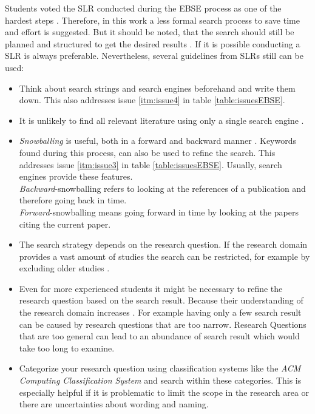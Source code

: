 Students voted the SLR conducted during the EBSE process as one of the hardest steps \cite{keele2007}. Therefore, in this work a less formal search process to save time and effort is suggested. But it should be noted, that the search should still be planned and structured to get the desired results . If it is possible conducting a SLR is always preferable.
\newline
\newline
Nevertheless, several guidelines from SLRs still can be used:
\begin{itemize}
\item Think about search strings and search engines beforehand and write them down. This also addresses issue \ref{itm:issue4} in table \ref{table:issuesEBSE}.

\item It is unlikely to find all relevant literature using only a single search engine \cite{Brereton2007}.

\item \emph{Snowballing} is useful, both in a forward and backward manner \cite{Wohlin2014}. Keywords found during this process, can also be used to refine the search. This addresses issue \ref{itm:issue3} in table \ref{table:issuesEBSE}. Usually, search engines provide these features.\\
\emph{Backward}-snowballing refers to looking at the references of a publication and therefore going back in time.\\
\emph{Forward}-snowballing means going forward in time by looking at the papers citing the current paper.

\item The search strategy depends on the research question. If the research domain provides a vast amount of studies the search can be restricted, for example by excluding older studies \cite{Brereton2007}.

\item Even for more experienced students it might be necessary to refine the research question based on the search result. Because their understanding of the research domain increases \cite{Brereton2007}. For example having only a few search result can be caused by research questions that are too narrow. Research Questions that are too general can lead to an abundance of search result which would take too long to examine.

\item Categorize your research question using classification systems like the \emph{ACM Computing Classification System} and search within these categories. This is especially helpful if it is problematic to limit the scope in the research area or there are uncertainties about wording and naming.
\end{itemize} 




